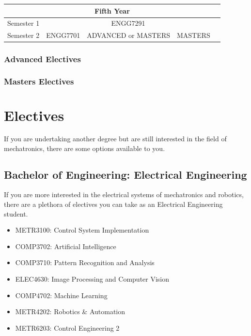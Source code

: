 \documentclass[a4paper,12pt]{report}
\begin{document}
\begin{table}[H]
    \centering
    \begin{tabular}{| m{6em} | m{5em} m{5em} m{5em} m{5em} m{5em} |}
        \hline
        \multicolumn{6}{|c|}{\bfseries Fifth Year} \\
        \hline
        Semester 1 & \multicolumn{4}{c}{ENGG7291} & \\
        Semester 2 & ENGG7701 & \multicolumn{2}{c}{ADVANCED or MASTERS} & MASTERS & \\
        \hline
    \end{tabular}
\end{table}
\renewcommand{\arraystretch}{1}
\newpage

\subsection{Advanced Electives}


\subsection{Masters Electives}


\chapter{Electives}
If you are undertaking another degree but are still interested in the field of mechatronics, there are some options available to you.

\section{Bachelor of Engineering: Electrical Engineering}
\vspace*{3mm}
If you are more interested in the electrical systems of mechatronics and robotics, there are a plethora of electives you can take as an Electrical Engineering student.
\begin{multicols}{2}
    \begin{itemize}
        \item METR3100: Control System Implementation
        \item COMP3702: Artificial Intelligence
        \item COMP3710: Pattern Recognition and Analysis
        \item ELEC4630: Image Processing and Computer Vision
        \item COMP4702: Machine Learning
        \item METR4202: Robotics \& Automation
        \item METR6203: Control Engineering 2
    \end{itemize}
\end{multicols}
\end{document}
